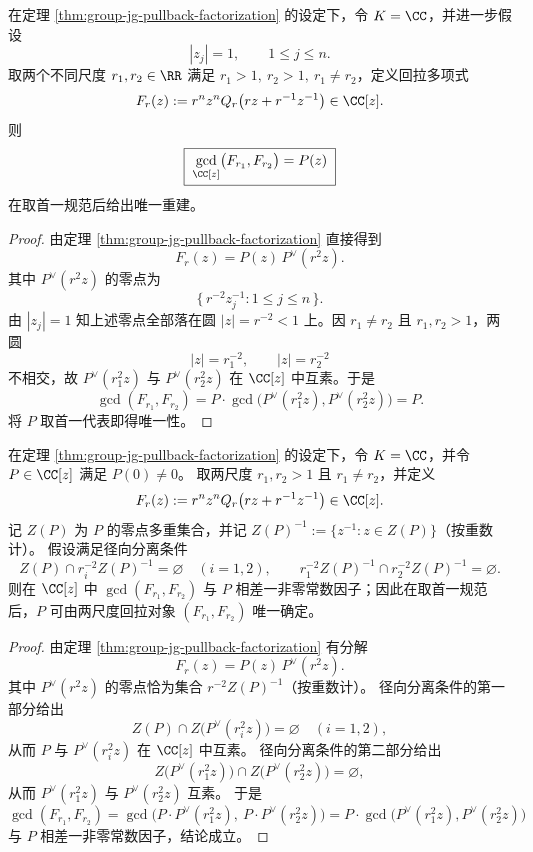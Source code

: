\begin{theorem}\label{thm:group-two-scale-holographic-recovery}
在定理 \ref{thm:group-jg-pullback-factorization} 的设定下，令 \(K=\CC\)，并进一步假设
\[
|z_j|=1,\qquad 1\le j\le n.
\]
取两个不同尺度 \(r_1,r_2\in\RR\) 满足 \(r_1>1,\ r_2>1,\ r_1\neq r_2\)，定义回拉多项式
\[
F_r(z):=r^n z^n Q_r\!\left(r z+r^{-1}z^{-1}\right)\in \CC[z].
\]
则
\[
\boxed{\;
\gcd_{\CC[z]}\bigl(F_{r_1},F_{r_2}\bigr)=P(z)
\;}
\]
在取首一规范后给出唯一重建。
\end{theorem}
\begin{proof}
由定理 \ref{thm:group-jg-pullback-factorization} 直接得到
\[
F_r(z)=P(z)\,P^{\vee}(r^2 z).
\]
其中 \(P^{\vee}(r^2 z)\) 的零点为
\[
\{\,r^{-2} z_j^{-1}:1\le j\le n\,\}.
\]
由 \(|z_j|=1\) 知上述零点全部落在圆 \(|z|=r^{-2}<1\) 上。因 \(r_1\neq r_2\) 且 \(r_1,r_2>1\)，两圆
\[
|z|=r_1^{-2},\qquad |z|=r_2^{-2}
\]
不相交，故 \(P^{\vee}(r_1^2 z)\) 与 \(P^{\vee}(r_2^2 z)\) 在 \(\CC[z]\) 中互素。于是
\[
\gcd(F_{r_1},F_{r_2})
=P\cdot \gcd\!\bigl(P^{\vee}(r_1^2 z),P^{\vee}(r_2^2 z)\bigr)
=P.
\]
将 \(P\) 取首一代表即得唯一性。
\end{proof}

\begin{theorem}[径向分离下的两尺度重建]\label{thm:group-two-scale-holographic-recovery-radial-separation}
在定理 \ref{thm:group-jg-pullback-factorization} 的设定下，令 \(K=\CC\)，并令 \(P\in\CC[z]\) 满足 \(P(0)\neq 0\)。
取两尺度 \(r_1,r_2>1\) 且 \(r_1\neq r_2\)，并定义
\[
F_r(z):=r^n z^n Q_r\!\left(r z+r^{-1}z^{-1}\right)\in\CC[z].
\]
记 \(Z(P)\) 为 \(P\) 的零点多重集合，并记 \(Z(P)^{-1}:=\{z^{-1}:z\in Z(P)\}\)（按重数计）。
假设满足径向分离条件
\[
Z(P)\cap r_i^{-2}Z(P)^{-1}=\varnothing\quad(i=1,2),
\qquad
r_1^{-2}Z(P)^{-1}\cap r_2^{-2}Z(P)^{-1}=\varnothing.
\]
则在 \(\CC[z]\) 中 \(\gcd(F_{r_1},F_{r_2})\) 与 \(P\) 相差一非零常数因子；因此在取首一规范后，\(P\) 可由两尺度回拉对象 \((F_{r_1},F_{r_2})\) 唯一确定。
\end{theorem}
\begin{proof}
由定理 \ref{thm:group-jg-pullback-factorization} 有分解
\[
F_r(z)=P(z)\,P^\vee(r^2 z).
\]
其中 \(P^\vee(r^2 z)\) 的零点恰为集合 \(r^{-2}Z(P)^{-1}\)（按重数计）。
径向分离条件的第一部分给出
\[
Z(P)\cap Z\bigl(P^\vee(r_i^2 z)\bigr)=\varnothing\quad(i=1,2),
\]
从而 \(P\) 与 \(P^\vee(r_i^2 z)\) 在 \(\CC[z]\) 中互素。
径向分离条件的第二部分给出
\[
Z\bigl(P^\vee(r_1^2 z)\bigr)\cap Z\bigl(P^\vee(r_2^2 z)\bigr)=\varnothing,
\]
从而 \(P^\vee(r_1^2 z)\) 与 \(P^\vee(r_2^2 z)\) 互素。
于是
\[
\gcd(F_{r_1},F_{r_2})
=\gcd\bigl(P\cdot P^\vee(r_1^2 z),\ P\cdot P^\vee(r_2^2 z)\bigr)
=P\cdot \gcd\bigl(P^\vee(r_1^2 z),P^\vee(r_2^2 z)\bigr)
\]
与 \(P\) 相差一非零常数因子，结论成立。
\end{proof}

